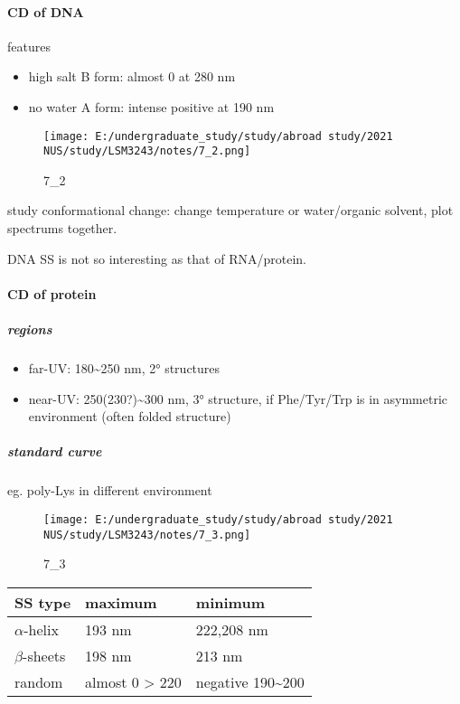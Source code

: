 \documentclass[]{article}
\let\oldparagraph\paragraph
\renewcommand{\paragraph}[1]{\oldparagraph{#1}\mbox{}}
\let\oldsubparagraph\subparagraph
\renewcommand{\subparagraph}[1]{\oldsubparagraph{#1}\mbox{}}
\begin{document}
\hypertarget{cd-of-dna}{%
\paragraph{CD of DNA}\label{cd-of-dna}}

features

\begin{itemize}
\item
  high salt B form: almost 0 at 280 nm
\item
  no water A form: intense positive at 190 nm
\end{itemize}

\begin{figure}
\centering
\texttt{[image: E:/undergraduate\_study/study/abroad study/2021 NUS/study/LSM3243/notes/7\_2.png]}
\caption{7\_2}
\end{figure}

study conformational change: change temperature or water/organic
solvent, plot spectrums together.

DNA SS is not so interesting as that of RNA/protein.

\hypertarget{cd-of-protein}{%
\paragraph{CD of protein}\label{cd-of-protein}}

\hypertarget{regions}{%
\subparagraph{regions}\label{regions}}

\begin{itemize}
\item
  far-UV: 180\textasciitilde{}250 nm, 2° structures
\item
  near-UV: 250(230?)\textasciitilde{}300 nm, 3° structure, if
  Phe/Tyr/Trp is in asymmetric environment (often folded structure)
\end{itemize}

\hypertarget{standard-curve}{%
\subparagraph{standard curve}\label{standard-curve}}

eg. poly-Lys in different environment

\begin{figure}
\centering
\texttt{[image: E:/undergraduate\_study/study/abroad study/2021 NUS/study/LSM3243/notes/7\_3.png]}
\caption{7\_3}
\end{figure}

\begin{longtable}[]{@{}lll@{}}
\toprule
SS type & maximum & minimum\tabularnewline
\midrule
\endhead
\(\alpha\)-helix & 193 nm & 222,208 nm\tabularnewline
\(\beta\)-sheets & 198 nm & 213 nm\tabularnewline
random & almost 0 \textgreater{} 220 & negative
190\textasciitilde{}200\tabularnewline
\bottomrule
\end{longtable}
\end{document}
